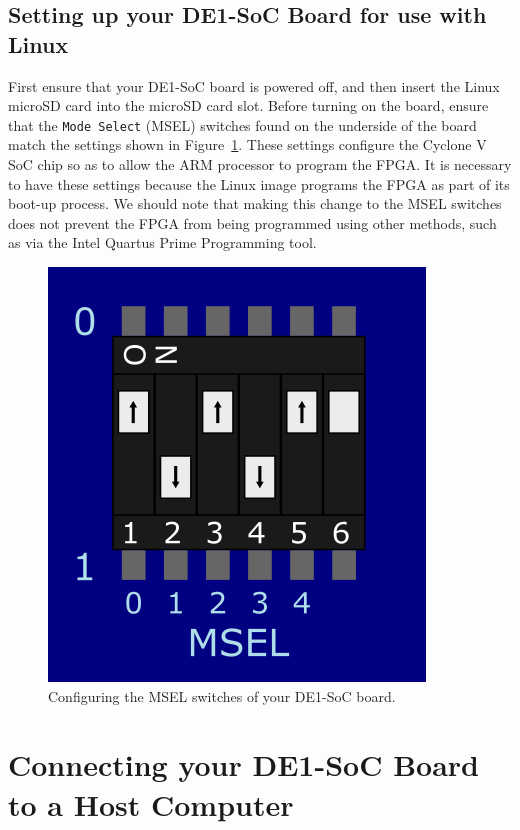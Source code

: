 \documentclass[11pt, twoside, pdftex]{article}
\begin{document}
\subsection{Setting up your DE1-SoC Board for use with Linux}

First ensure that your DE1-SoC board is powered off, and then insert the Linux 
microSD card into the microSD card slot. Before turning on the board, ensure that the
\texttt{Mode Select} (MSEL) switches found on the underside of the board match the settings shown 
in Figure~\ref{fig:msel}. These settings configure the Cyclone V SoC chip so as to allow the 
ARM processor to program the FPGA. It is necessary to have these settings because the Linux 
image programs the FPGA as part of its boot-up process. We should note that making this
change to the MSEL switches does not prevent the FPGA from being programmed using other
methods, such as via the Intel Quartus Prime Programming tool.

\begin{figure} [H]
\begin{center}
\includegraphics[scale = 1.00]{figures/MSEL.png}
\end{center}
\caption{Configuring the MSEL switches of your DE1-SoC board.}
\label{fig:msel}
\end{figure}

\section{Connecting your DE1-SoC Board to a Host Computer}
\end{document}
